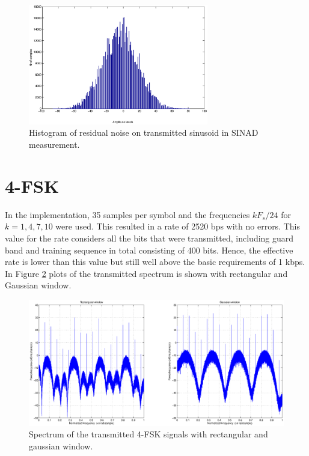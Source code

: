 \documentclass[12pt,a4paper,openright]{report}
\begin{document}
\begin{figure}[H]
  \centering
    \includegraphics[width=0.7\textwidth]{snr_noise_histogram.eps}
    \caption[BFSK example]{Histogram of residual noise on transmitted sinusoid in SINAD measurement.}
    \label{fig:noise_histogram}
\end{figure}

\section{4-FSK}

In the implementation, 35 samples per symbol and the frequencies \(kF_s/24\) for \(k=1,4,7,10\) were used. This resulted in a rate of 
2520 bps with no errors.  This value for the rate considers all the bits that were transmitted, including guard band and training sequence in total consisting of 400 bits. Hence, the effective rate is lower than this value but still well above the basic requirements of 1 kbps. 
In Figure \ref{fig:4FSKspectrum} plots of the transmitted spectrum is shown with rectangular and Gaussian window. 

\begin{figure}[H]
  \centering
    \includegraphics[width=1.0\textwidth]{4FSKspectrum_windoweffect.eps}
    \caption[4-FSK spectrum]{Spectrum of the transmitted 4-FSK signals with rectangular and gaussian window.}
    \label{fig:4FSKspectrum}
\end{figure}
\end{document}

